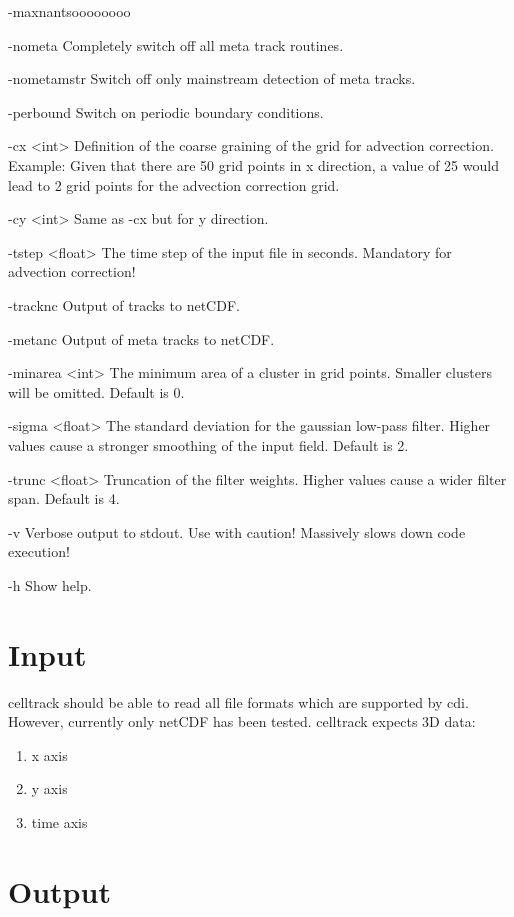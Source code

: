 \documentclass{scrartcl}
\begin{document}
\begin{labeling}{-maxnantsoooooooo}
    \item[-nometa] Completely switch off all meta track routines.
    \item[-nometamstr] Switch off only mainstream detection of meta tracks.
    \item[-perbound] Switch on periodic boundary conditions.
    \item[-cx \textless int\textgreater] Definition of the coarse graining of the grid for advection correction. Example: Given that there are 50 grid points in x direction, a value of 25 would lead to 2 grid points for the advection correction grid. 
    \item[-cy \textless int\textgreater] Same as -cx but for y direction.
    \item[-tstep \textless float\textgreater] The time step of the input file in seconds. Mandatory for advection correction!
    \item[-tracknc] Output of tracks to netCDF.
    \item[-metanc] Output of meta tracks to netCDF.
    \item[-minarea \textless int\textgreater] The minimum area of a cluster in grid points. Smaller clusters will be omitted. Default is 0.
    \item[-sigma \textless float\textgreater] The standard deviation for the gaussian low-pass filter. Higher values cause a stronger smoothing of the input field. Default is 2.
    \item[-trunc \textless float\textgreater] Truncation of the filter weights. Higher values cause a wider filter span. Default is 4.
	\item[-v] Verbose output to stdout. Use with caution! Massively slows down code execution!
	\item[-h] Show help.
\end{labeling}

\section{Input}
celltrack should be able to read all file formats which are supported by cdi. However, currently only netCDF has been tested.
celltrack expects 3D data:
\begin{enumerate}
	\item x axis
	\item y axis
    \item time axis
\end{enumerate}

\section{Output}
\label{sec:output}
\end{document}
